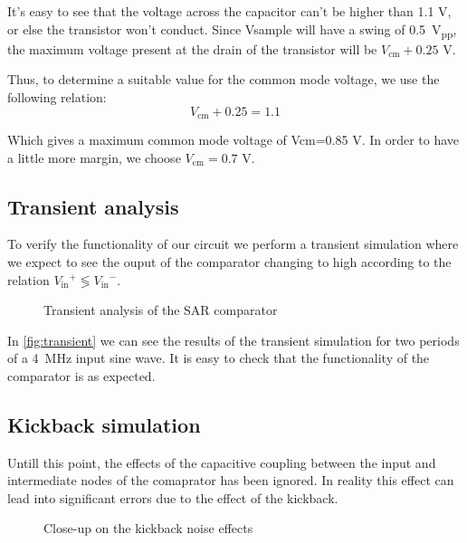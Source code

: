 \documentclass{article}
\newcommand*{\subb}[1]{\ensuremath{_{\mathrm{#1}}}}
\begin{document}
 It’s easy to see that the voltage across the capacitor can’t be higher than 1.1 V, or else the transistor won’t conduct. Since Vsample will have a swing of \SI{0.5}{\volt_{pp}}, the maximum voltage present at the drain of the transistor will be $V\subb{cm} + 0.25$ V.

 Thus, to determine a suitable value for the common mode voltage, we use the following relation:
 \begin{equation}
  V\subb{cm} + 0.25=1.1
 \end{equation}

 Which gives a maximum common mode voltage of Vcm=0.85 V. In order to have a little more margin, we choose $V\subb{cm}=0.7$ V.


 \subsection{Transient analysis}
 To verify the functionality of our circuit we perform a transient simulation where we expect to see the ouput of the comparator changing to high according to the relation $V\subb{in}^+\lessgtr V\subb{in}^-$.

 \begin{figure}[!h]
  \centering
  \caption{Transient analysis of the SAR comparator}
  \label{fig:transient}
  
 \end{figure}

 In \autoref{fig:transient} we can see the results of the transient simulation for two periods of a \SI{4}{\MHz} input sine wave. It is easy to check that the functionality of the comparator is as expected.
 \subsection{Kickback simulation}
 Untill this point, the effects of the capacitive coupling between the input and intermediate nodes of the comaprator has been ignored. In reality this effect can lead into significant errors due to the effect of the kickback.

 \begin{figure}[!h]
  \centering
  \caption{Close-up on the kickback noise effects}
  \label{fig:kickback_closeup}
  
 \end{figure}
\end{document}
